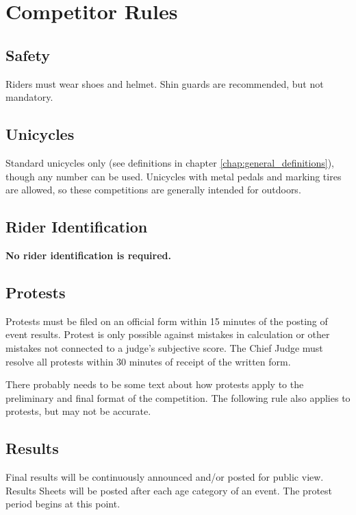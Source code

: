 \chapter{Competitor Rules}

\section{Safety}

Riders must wear shoes and helmet.
Shin guards are recommended, but not mandatory.

\section{Unicycles}

Standard unicycles only (see definitions in chapter \ref{chap:general_definitions}), though any number can be used.
Unicycles with metal pedals and marking tires are allowed, so these competitions are generally intended for outdoors.

\section{Rider Identification}

\textbf{No rider identification is required.}

\section{Protests}

Protests must be filed on an official form within 15 minutes of the posting of event results.
Protest is only possible against mistakes in calculation or other mistakes not connected to a judge's subjective score.
The Chief Judge must resolve all protests within 30 minutes of receipt of the written form.

\begin{comment-2016}
There probably needs to be some text about how protests apply to the preliminary and final format of the competition.  The following rule also applies to protests, but may not be accurate.
\end{comment-2016}

\section{Results}
Final results will be continuously announced and/or posted for public view.
Results Sheets will be posted after each age category of an event.
The protest period begins at this point.

